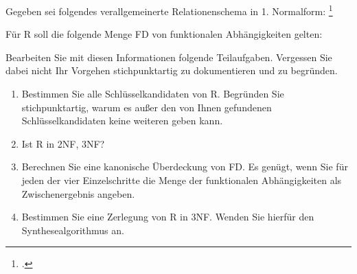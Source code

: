 \documentclass{lehramt-informatik-aufgabe}
\begin{document}

Gegeben sei folgendes verallgemeinerte Relationenschema in 1. Normalform:
\footcite{examen:66116:2015:09}

\begin{center}
\end{center}

Für R soll die folgende Menge FD von funktionalen Abhängigkeiten gelten:


Bearbeiten Sie mit diesen Informationen folgende Teilaufgaben. Vergessen
Sie dabei nicht Ihr Vorgehen stichpunktartig zu dokumentieren und zu
begründen.

\begin{enumerate}


\item Bestimmen Sie alle Schlüsselkandidaten von R. Begründen Sie
stichpunktartig, warum es außer den von Ihnen gefundenen
Schlüsselkandidaten keine weiteren geben kann.


\item Ist R in 2NF, 3NF?


\item Berechnen Sie eine kanonische Überdeckung von FD. Es genügt, wenn
Sie für jeden der vier Einzelschritte die Menge der funktionalen
Abhängigkeiten als Zwischenergebnis angeben.


\item Bestimmen Sie eine Zerlegung von R in 3NF. Wenden Sie hierfür den
Synthesealgorithmus an.

\end{enumerate}
\end{document}
